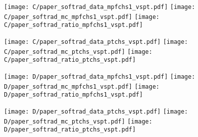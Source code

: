 \documentclass[landscape,10pt]{beamer} %
\newcommand{\commentout}[1]{}
\begin{document}
\commentout{
\newpage

\begin{figure}[p]
\centering
  \texttt{[image: compareJECdata\_JME100vsSum16V4\_data\_gamjet\_mpfchs1\_a30.pdf]}
  \texttt{[image: compareJECdata\_JME100vsSum16V4\_mc\_gamjet\_mpfchs1\_a30.pdf]}
  \texttt{[image: compareJECdata\_JME100vsSum16V4\_ratio\_gamjet\_mpfchs1\_a30.pdf]}
\\
\centering
  \texttt{[image: compareJECdata\_JME100vsSum16V4\_data\_gamjet\_ptchs\_a30.pdf]}
  \texttt{[image: compareJECdata\_JME100vsSum16V4\_mc\_gamjet\_ptchs\_a30.pdf]}
  \texttt{[image: compareJECdata\_JME100vsSum16V4\_ratio\_gamjet\_ptchs\_a30.pdf]}
\end{figure}
} %

\newpage

\begin{figure}[p]
\centering
  \texttt{[image: C/paper\_softrad\_data\_mpfchs1\_vspt.pdf]}
  \texttt{[image: C/paper\_softrad\_mc\_mpfchs1\_vspt.pdf]}
  \texttt{[image: C/paper\_softrad\_ratio\_mpfchs1\_vspt.pdf]}
\end{figure}

\begin{figure}[p]
\centering
  \texttt{[image: C/paper\_softrad\_data\_ptchs\_vspt.pdf]}
  \texttt{[image: C/paper\_softrad\_mc\_ptchs\_vspt.pdf]}
  \texttt{[image: C/paper\_softrad\_ratio\_ptchs\_vspt.pdf]}
\end{figure}

\newpage

\begin{figure}[p]
\centering
  \texttt{[image: D/paper\_softrad\_data\_mpfchs1\_vspt.pdf]}
  \texttt{[image: D/paper\_softrad\_mc\_mpfchs1\_vspt.pdf]}
  \texttt{[image: D/paper\_softrad\_ratio\_mpfchs1\_vspt.pdf]}
\end{figure}

\begin{figure}[p]
\centering
  \texttt{[image: D/paper\_softrad\_data\_ptchs\_vspt.pdf]}
  \texttt{[image: D/paper\_softrad\_mc\_ptchs\_vspt.pdf]}
  \texttt{[image: D/paper\_softrad\_ratio\_ptchs\_vspt.pdf]}
\end{figure}
\end{document}
